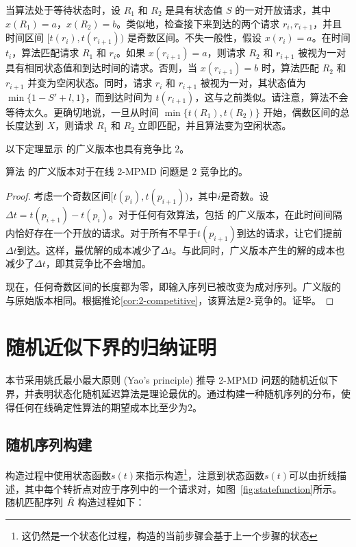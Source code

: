 当算法处于等待状态时，设 $R_1$ 和 $R_2$ 是具有状态值 $S$ 的一对开放请求，其中 $x(R_1)=a$，$x(R_2)=b$。类似地，检查接下来到达的两个请求 $r_i,r_{i+1}$，并且时间区间 $[t(r_i),t(r_{i+1}))$ 是奇数区间。不失一般性，假设 $x(r_i)=a$。在时间 $t_i$，算法匹配请求 $R_1$ 和 $r_i$。如果 $x(r_{i+1})=a$，则请求 $R_2$ 和 $r_{i+1}$ 被视为一对具有相同状态值和到达时间的请求。否则，当 $x(r_{i+1})=b$ 时，算法匹配 $R_2$ 和 $r_{i+1}$ 并变为空闲状态。同时，请求 $r_i$ 和 $r_{i+1}$ 被视为一对，其状态值为 $\min\{1-S'+l,1\}$，而到达时间为 $t(r_{i+1})$，这与之前类似。请注意，算法不会等待太久。更确切地说，一旦从时间 $\min\{t(R_1),t(R_2)\}$ 开始，偶数区间的总长度达到 $X$，则请求 $R_1$ 和 $R_2$ 立即匹配，并且算法变为空闲状态。

以下定理显示 \ralgo 的广义版本也具有竞争比 $2$。

\begin{theorem}
算法 \ralgo 的广义版本对于在线 2-MPMD 问题是 $2$ 竞争比的。
\end{theorem}

\begin{proof}
    考虑一个奇数区间$[t(p_i),t(p_{i+1}))$，其中$i$是奇数。设$\Delta t=t(p_{i+1})-t(p_i)$。对于任何有效算法，包括 \ralgo 的广义版本，在此时间间隔内恰好存在一个开放的请求。对于所有不早于$t(p_{i+1})$到达的请求，让它们提前$\Delta t$到达。这样，最优解的成本减少了$\Delta t$。与此同时，\ralgo 广义版本产生的解的成本也减少了$\Delta t$，即其竞争比不会增加。
    
    现在，任何奇数区间的长度都为零，即输入序列已被改变为成对序列。广义版的 \ralgo 与原始版本相同。根据推论\ref{cor:2-competitive}，该算法是$2$-竞争的。证毕。
\end{proof}


\section{随机近似下界的归纳证明} \label{sec:3-lowerbound}
本节采用姚氏最小最大原则 (Yao's principle) \cite{yao1977probabilistic} 推导 2-MPMD 问题的随机近似下界，并表明状态化随机延迟算法是理论最优的。通过构建一种随机序列的分布，使得任何在线确定性算法的期望成本比至少为$2$。

\subsection{随机序列构建}
构造过程中使用状态函数$s(t)$来指示构造\footnote{这仍然是一个状态化过程，构造的当前步骤会基于上一个步骤的状态}，注意到状态函数$s(t)$可以由折线描述，其中每个转折点对应于序列中的一个请求对，如图~\ref{fig:statefunction}所示。随机匹配序列 $\tilde{R}$ 构造过程如下：

